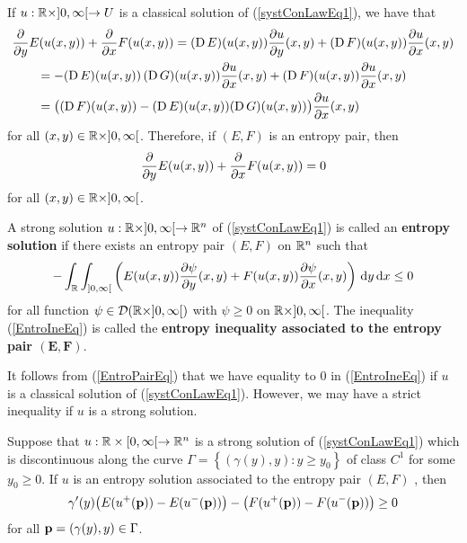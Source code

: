 If $u:\RR\times ]0,\infty[ \to U$ is a classical solution of
(\ref{systConLawEq1}), we have that
\begin{align*}
&\pdfdx{E(u(x,y))}{y} + \pdfdx{F(u(x,y))}{x}
= (\diff E)(u(x,y)) \pdydx{u}{y}(x,y) + (\diff F)(u(x,y)) \pdydx{u}{x}(x,y)  \\
&\qquad = - (\diff E)(u(x,y))\, (\diff G)(u(x,y)) \pdydx{u}{x}(x,y)
+ (\diff F)(u(x,y)) \pdydx{u}{x}(x,y) \\
&\qquad = \big( (\diff F)(u(x,y)) - (\diff E)(u(x,y)) (\diff G)(u(x,y)) \big)
\pdydx{u}{x}(x,y)
\end{align*}
for all $(x,y) \in \RR\times ]0,\infty[$.
Therefore, if $(E,F)$ is an entropy pair, then
\begin{equation} \label{EntroPairEq}
\pdfdx{E(u(x,y))}{y} + \pdfdx{F(u(x,y))}{x} = 0
\end{equation}
for all $(x,y) \in \RR\times ]0,\infty[$.

\begin{defn} \label{dnfEntroSol}
A strong solution $u:\RR\times ]0,\infty[\to \RR^n$ of (\ref{systConLawEq1})
is called an {\bfseries entropy solution} if there exists an entropy pair $(E,F)$ on $\RR^n$
such that
\begin{equation} \label{EntroIneEq}
-\int_{\RR}\int_{]0,\infty[}
\left( E(u(x,y)) \pdydx{\psi}{y}(x,y) +
  F(u(x,y)) \pdydx{\psi}{x}(x,y) \right) \dx{y}\dx{x} \leq 0
\end{equation}
for all function $\psi \in \DD(\RR\times]0,\infty[)$ with
$\psi \geq 0$ on $\RR\times]0,\infty[$.  The inequality
(\ref{EntroIneEq}) is called the {\bfseries entropy inequality
associated to the entropy pair $\mathbf{(E,F)}$}.
\end{defn}

It follows from (\ref{EntroPairEq}) that we have equality to $0$ in
(\ref{EntroIneEq}) if $u$ is a classical solution of
(\ref{systConLawEq1}).  However, we may have a strict inequality if
$u$ is a strong solution.

\begin{lemma}
Suppose that $u:\RR\times [0,\infty[ \to \RR^n$ is a strong solution of
(\ref{systConLawEq1}) which is discontinuous along the curve
$\displaystyle \Gamma = \left\{ (\gamma(y),y) : y \geq y_0 \right\}$ of
class $\displaystyle C^1$ for some $y_0\geq 0$.  If $u$ is an entropy
solution associated to the entropy pair $(E,F)$ \footnotemark, then
\begin{equation} \label{EntrJumpEq}
\gamma'(y) \big( E(u^+(\VEC{p})) - E(u^-(\VEC{p})) \big)
- \big( F(u^+(\VEC{p}))- F(u^-(\VEC{p})) \big) \geq 0
\end{equation}
for all $\VEC{p}=(\gamma(y),y) \in \Gamma$.
\end{lemma}


